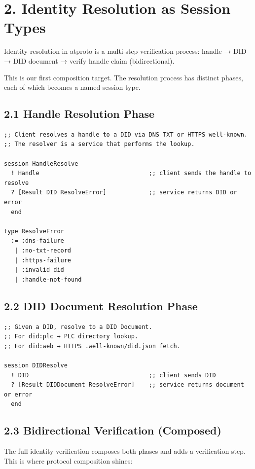 \documentclass[11pt]{article}
\begin{document}
\section{2. Identity Resolution as Session Types}
\label{sec:orgf91427b}

Identity resolution in atproto is a multi-step verification process:
handle → DID → DID document → verify handle claim (bidirectional).

This is our first composition target. The resolution process has distinct
phases, each of which becomes a named session type.
\subsection{2.1 Handle Resolution Phase}
\label{sec:org4261296}

\begin{verbatim}
;; Client resolves a handle to a DID via DNS TXT or HTTPS well-known.
;; The resolver is a service that performs the lookup.

session HandleResolve
  ! Handle                               ;; client sends the handle to resolve
  ? [Result DID ResolveError]            ;; service returns DID or error
  end

type ResolveError
  := :dns-failure
   | :no-txt-record
   | :https-failure
   | :invalid-did
   | :handle-not-found
\end{verbatim}
\subsection{2.2 DID Document Resolution Phase}
\label{sec:org4684456}

\begin{verbatim}
;; Given a DID, resolve to a DID Document.
;; For did:plc → PLC directory lookup.
;; For did:web → HTTPS .well-known/did.json fetch.

session DIDResolve
  ! DID                                  ;; client sends DID
  ? [Result DIDDocument ResolveError]    ;; service returns document or error
  end
\end{verbatim}
\subsection{2.3 Bidirectional Verification (Composed)}
\label{sec:org1d031be}

The full identity verification composes both phases and adds a verification
step. This is where protocol composition shines:
\end{document}
